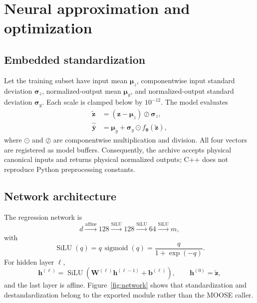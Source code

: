 \documentclass[11pt]{article}
\begin{document}
\section{Neural approximation and optimization}

\subsection{Embedded standardization}

Let the training subset have input mean \(\boldsymbol{\mu}_z\), componentwise input standard
deviation \(\boldsymbol{\sigma}_z\), normalized-output mean
\(\boldsymbol{\mu}_y\), and normalized-output standard deviation
\(\boldsymbol{\sigma}_y\).  Each scale is clamped below by \(10^{-12}\).  The model evaluates
\begin{align}
  \widetilde{\boldsymbol{z}}
    &=\left(\boldsymbol{z}-\boldsymbol{\mu}_z\right)
      \oslash\boldsymbol{\sigma}_z,
      \label{eq:input-standardization}\\
  \widehat{\bar{\boldsymbol{y}}}
    &=\boldsymbol{\mu}_y+
      \boldsymbol{\sigma}_y\odot
      f_{\boldsymbol{\theta}}(\widetilde{\boldsymbol{z}}),
      \label{eq:output-destandardization}
\end{align}
where \(\odot\) and \(\oslash\) are componentwise multiplication and division.  All four vectors
are registered as model buffers.  Consequently, the archive accepts physical canonical inputs
and returns physical normalized outputs; C++ does not reproduce Python preprocessing constants.

\subsection{Network architecture}

The regression network is
\begin{equation}
  d
  \xrightarrow{\mathrm{affine}}\!128
  \xrightarrow{\mathrm{SiLU}}\!128
  \xrightarrow{\mathrm{SiLU}}\!64
  \xrightarrow{\mathrm{SiLU}}\!m,
  \label{eq:architecture}
\end{equation}
with
\begin{equation}
  \operatorname{SiLU}(q)=q\,\operatorname{sigmoid}(q)
  =\frac{q}{1+\exp(-q)}.
  \label{eq:silu}
\end{equation}
For hidden layer \(\ell\),
\begin{equation}
  \boldsymbol{h}^{(\ell)}
  =\operatorname{SiLU}\left(
    \mathbf{W}^{(\ell)}\boldsymbol{h}^{(\ell-1)}
    +\boldsymbol{b}^{(\ell)}
  \right),
  \qquad
  \boldsymbol{h}^{(0)}=\widetilde{\boldsymbol{z}},
  \label{eq:hidden}
\end{equation}
and the last layer is affine.  Figure~\ref{fig:network} shows that standardization and
destandardization belong to the exported module rather than the MOOSE caller.
\end{document}
